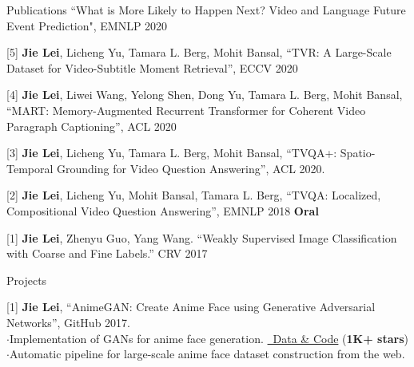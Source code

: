 \documentclass{resume} %
\begin{document}
\begin{rSection}{Publications}
{            ``What is More Likely to Happen Next? Video and Language Future Event Prediction",
            EMNLP 2020
            }
   \item {[5] \textbf{Jie Lei}, Licheng Yu, Tamara L. Berg, Mohit Bansal,
        ``TVR: A Large-Scale Dataset for Video-Subtitle Moment Retrieval'',
            ECCV 2020
            }
   \item {[4] \textbf{Jie Lei}, Liwei Wang, Yelong Shen, Dong Yu, Tamara L. Berg, Mohit Bansal,
         ``MART: Memory-Augmented Recurrent Transformer for Coherent Video Paragraph Captioning'',
         ACL 2020
         }
   \item {[3] \textbf{Jie Lei}, Licheng Yu, Tamara L. Berg, Mohit Bansal,
               ``TVQA+: Spatio-Temporal Grounding for Video Question Answering'',
               ACL 2020.
               }
    \item {[2] \textbf{Jie Lei}, Licheng Yu, Mohit Bansal, Tamara L. Berg,
               ``TVQA: Localized, Compositional Video Question Answering'',
               EMNLP 2018 {\color{bittersweet}\textbf{Oral}}
               }
    \item {[1] \textbf{Jie Lei}, Zhenyu Guo, Yang Wang.
                ``Weakly Supervised Image Classification with Coarse and Fine Labels.''
                CRV 2017
                }
\end{rSection}


\begin{rSection}{Projects}
    \item {[1] \textbf{Jie Lei},
                ``AnimeGAN: Create Anime Face using Generative Adversarial Networks'',
                GitHub 2017.
                \\ $\cdot$\quad Implementation of GANs for anime face generation.
                \href{https://github.com/jayleicn/animeGAN}{\color{codelinkcolor}\faGithub~Data \& Code} (\textbf{1K+ stars})
                \\ $\cdot$\quad Automatic pipeline for large-scale anime face dataset construction from the web.}
\end{rSection}


\end{document}
